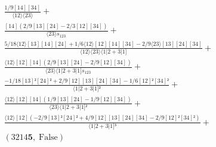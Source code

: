 \documentclass[varwidth, border=5pt]{standalone}
\begin{document}
\begin{my}
$\begin{gathered}
\scriptscriptstyle\frac{1/9[14][34]}{⟨12⟩⟨23⟩} +\\
\scriptscriptstyle\frac{[14](2/9[13][24]-2/3[12][34])}{⟨23⟩s_{123}} +\\
\scriptscriptstyle\frac{5/18⟨12⟩[13][14][24]+1/6⟨12⟩[12][14][34]-2/9⟨23⟩[13][24][34]}{⟨12⟩⟨23⟩⟨1|2+3|1]} +\\
\scriptscriptstyle\frac{⟨12⟩[12][14](2/9[13][24]-2/9[12][34])}{⟨23⟩⟨1|2+3|1]s_{123}} +\\
\scriptscriptstyle\frac{-1/18[13]²[24]²+2/9[12][13][24][34]-1/6[12]²[34]²}{⟨1|2+3|1]²} +\\
\scriptscriptstyle\frac{⟨12⟩[12][14](1/9[13][24]-1/9[12][34])}{⟨23⟩⟨1|2+3|1]²} +\\
\scriptscriptstyle\frac{⟨12⟩[12](-2/9[13]²[24]²+4/9[12][13][24][34]-2/9[12]²[34]²)}{⟨1|2+3|1]³} +\\
\scriptscriptstyle(3214𝟓,\;\text{False}) \phantom{+}
\end{gathered}$
\end{my}
\end{document}
